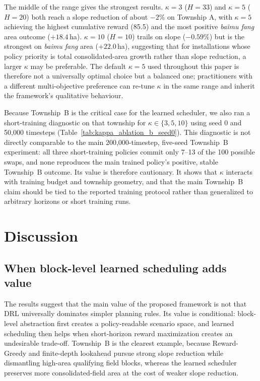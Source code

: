 \documentclass[preprint,12pt]{elsarticle}
\begin{document}
The middle of the range gives the strongest results. $\kappa = 3$ ($H = 33$) and $\kappa = 5$ ($H = 20$) both reach a slope reduction of about $-2\%$ on Township A, with $\kappa = 5$ achieving the highest cumulative reward (85.5) and the most positive \textit{baimu fang} area outcome ($+18.4$\,ha). $\kappa = 10$ ($H = 10$) trails on slope ($-0.59\%$) but is the strongest on \textit{baimu fang} area ($+22.0$\,ha), suggesting that for installations whose policy priority is total consolidated-area growth rather than slope reduction, a larger $\kappa$ may be preferable. The default $\kappa = 5$ used throughout this paper is therefore not a universally optimal choice but a balanced one; practitioners with a different multi-objective preference can re-tune $\kappa$ in the same range and inherit the framework's qualitative behaviour.

Because Township~B is the critical case for the learned scheduler, we also ran a short-training diagnostic on that township for $\kappa \in \{3,5,10\}$ using seed 0 and 50{,}000 timesteps (Table~\ref{tab:kappa_ablation_b_seed0}). This diagnostic is not directly comparable to the main 200{,}000-timestep, five-seed Township~B experiment: all three short-training policies commit only 7--13 of the 100 possible swaps, and none reproduces the main trained policy's positive, stable Township~B outcome. Its value is therefore cautionary. It shows that $\kappa$ interacts with training budget and township geometry, and that the main Township~B claim should be tied to the reported training protocol rather than generalized to arbitrary horizons or short training runs.




\section{Discussion}
\label{sec:discussion}

\subsection{When block-level learned scheduling adds value}

The results suggest that the main value of the proposed framework is not that DRL universally dominates simpler planning rules. Its value is conditional: block-level abstraction first creates a policy-readable scenario space, and learned scheduling then helps when short-horizon reward maximization creates an undesirable trade-off. Township~B is the clearest example, because Reward-Greedy and finite-depth lookahead pursue strong slope reduction while dismantling high-area qualifying field blocks, whereas the learned scheduler preserves more consolidated-field area at the cost of weaker slope reduction.
\end{document}
